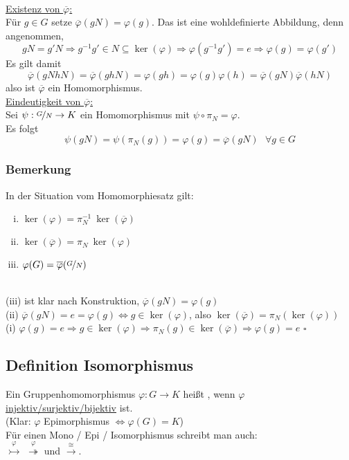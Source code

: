 \\
\uline{Existenz von $\overline{\varphi}$:}\\
Für $g \in G$ setze $\overline{\varphi}(gN)=\varphi(g)$. Das ist eine wohldefinierte Abbildung, denn angenommen, 
\[
gN=g'N \Rightarrow g^{-1}g' \in N \subseteq \ker(\varphi) \Rightarrow \varphi(g^{-1}g')=e \Rightarrow \varphi(g)=\varphi(g')
\]
Es gilt damit
\[
\overline{\varphi}(gNhN)=\overline{\varphi}(ghN)=\varphi(gh)=\varphi(g)\varphi(h)=\overline{\varphi}(gN)\overline{\varphi}(hN) 
\]
also ist $\overline{\varphi}$ ein Homomorphismus.\\

\uline{Eindeutigkeit von $\overline{\varphi}$:}\\ Sei $\psi: \nicefrac{G}{N} \to K$ ein Homomorphismus mit $\psi \circ \pi_N = \varphi$.\\
Es folgt 
\[
\psi(gN)=\psi(\pi_N(g))=\varphi(g)=\overline{\varphi}(gN) ~~~\forall g \in G
\]

\subsubsection*{Bemerkung}
In der Situation vom Homomorphiesatz gilt:
\begin{enumerate}[(i)]
	\item $\ker(\varphi)=\pi_N^{-1}~\ker(\overline{\varphi})$
	\item $\ker(\overline{\varphi})=\pi_N~\ker(\varphi)$
	\item $\varphi(G)=\overline{\varphi}(\nicefrac{G}{N})$
\end{enumerate}
\\
(iii) ist klar nach Konstruktion, $\overline{\varphi}(gN)=\varphi(g)$\\
(ii) $\overline{\varphi}(gN)=e=\varphi(g) \Leftrightarrow g \in\ker(\varphi)$, also $\ker(\overline{\varphi})=\pi_N(\ker(\varphi))$\\
(i) $\varphi(g)=e \Rightarrow g \in \ker(\varphi) \Rightarrow\pi_N(g) \in \ker(\overline{\varphi}) \Rightarrow \varphi(g)=e$
\hfill $\square$


\subsection{Definition Isomorphismus}
\label{sub:def_isomorph}
Ein Gruppenhomomorphismus $\varphi:G \to K$ heißt , wenn $\varphi$ \uline{injektiv/surjektiv/bijektiv} ist.\\
(Klar: $\varphi$ Epimorphismus $\Leftrightarrow \varphi(G)=K$)\\
Für einen Mono / Epi / Isomorphismus schreibt man auch: \\
$\stackrel{\varphi}{\rightarrowtail}$  $\stackrel{\varphi}{\twoheadrightarrow}$  und  $\stackrel{\cong}{\to}$.

